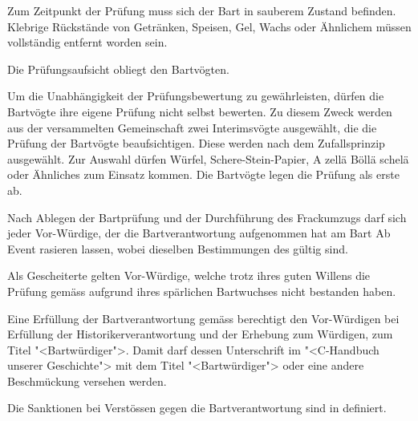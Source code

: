 \documentclass[fontsize=12pt,parskip=half]{scrartcl}
\begin{document}
\begin{contract}
  \SubClause[title={Zustand des Bartes}]
  Zum Zeitpunkt der Prüfung muss sich der Bart in sauberem Zustand befinden. Klebrige Rückstände von Getränken,
  Speisen, Gel, Wachs oder Ähnlichem müssen vollständig entfernt worden sein.

  \SubClause[title={Prüfungsaufsicht}]
  Die Prüfungsaufsicht obliegt den Bartvögten.

  \SubClause[title={Prüfung der Bartvögte}]
  Um die Unabhängigkeit der Prüfungsbewertung zu gewährleisten, dürfen die Bartvögte ihre eigene Prüfung nicht selbst bewerten.
  Zu diesem Zweck werden aus der versammelten Gemeinschaft zwei Interimsvögte ausgewählt, die die Prüfung
  der Bartvögte beaufsichtigen. Diese werden nach dem Zufallsprinzip ausgewählt. Zur Auswahl dürfen Würfel,
  Schere-Stein-Papier, A zellä Böllä schelä oder Ähnliches zum Einsatz kommen. Die Bartvögte legen die
  Prüfung als erste ab.

  \Clause[title={BartAb}]
  Nach Ablegen der Bartprüfung und der Durchführung des Frackumzugs darf sich jeder Vor-Würdige, der die Bartverantwortung aufgenommen
  hat am Bart Ab Event rasieren lassen, wobei dieselben Bestimmungen des  gültig sind.

  \Clause[title={Gescheiterte}]\label{B.gescheiterte}
  Als Gescheiterte gelten Vor-Würdige, welche trotz ihres guten Willens die Prüfung gemäss 
  aufgrund ihres spärlichen Bartwuchses nicht bestanden haben.

  \Clause[title={Titel}]\label{B.barttitel}
  Eine Erfüllung der Bartverantwortung gemäss  berechtigt den Vor-Würdigen bei Erfüllung der Historikerverantwortung 
  und der Erhebung zum Würdigen, zum Titel "<Bartwürdiger">. Damit darf dessen Unterschrift im "<C-Handbuch unserer Geschichte"> mit dem Titel "<Bartwürdiger"> oder eine andere
  Beschmückung versehen werden.

  \Clause[title={Sanktionen}]\label{B.sanktionen}
  Die Sanktionen bei Verstössen gegen die Bartverantwortung sind in  definiert.

\end{contract}

\pagebreak
\end{document}
